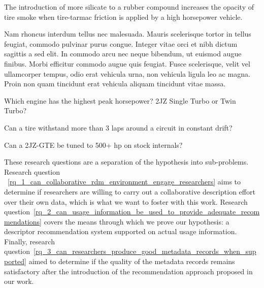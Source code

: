 \begin{thesisstatement}
The introduction of more silicate to a rubber compound increases the opacity of tire smoke when tire-tarmac friction is applied by a high horsepower vehicle.
\label{hypothesis}
\end{thesisstatement}

Nam rhoncus interdum tellus nec malesuada. Mauris scelerisque tortor in tellus feugiat, commodo pulvinar purus congue. Integer vitae orci et nibh dictum sagittis a sed elit. In commodo arcu nec neque bibendum, ut euismod augue finibus. Morbi efficitur commodo augue quis feugiat. Fusce scelerisque, velit vel ullamcorper tempus, odio erat vehicula urna, non vehicula ligula leo ac magna. Proin non quam tincidunt erat vehicula aliquam tincidunt vitae massa.

\begin{researchquestion}
Which engine has the highest peak horsepower? 2JZ Single Turbo or Twin Turbo?
\label{rq_1_can_collaborative_rdm_environment_engage_researchers}
\end{researchquestion}

\begin{researchquestion}
Can a tire withstand more than 3 laps around a circuit in constant drift?
\label{rq_2_can_usage_information_be_used_to_provide_adequate_recommendations}
\end{researchquestion}

\begin{researchquestion}
Can a 2JZ-GTE be tuned to 500+ hp on stock internals?
\label{rq_3_can_researchers_produce_good_metadata_records_when_supported}
\end{researchquestion}

These research questions are a separation of the hypothesis into sub-problems. Research question ~\ref{rq_1_can_collaborative_rdm_environment_engage_researchers} aims to determine if researchers are willing to carry out a collaborative description effort over their own data, which is what we want to foster with this work. Research question~\ref{rq_2_can_usage_information_be_used_to_provide_adequate_recommendations} covers the means through which we prove our hypothesis: a descriptor recommendation system supported on actual usage information.
%
Finally, research question~\ref{rq_3_can_researchers_produce_good_metadata_records_when_supported} aimed to determine if the quality of the metadata records remains satisfactory after the introduction of the recommendation approach proposed in our work.


